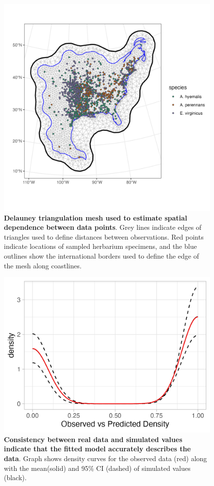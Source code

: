 \documentclass[11pt]{article}
\begin{document}
	\begin{figure}[H]
		\centering
		\includegraphics[width = \linewidth]{../Plots/mesh_plot.png}
		\caption{\textbf{Delauney triangulation mesh used to estimate spatial dependence between data points}. Grey lines indicate edges of triangles used to define distances between observations. Red points indicate locations of sampled herbarium specimens, and the blue outlines show the international borders used to define the edge of the mesh along coastlines.}
		\label{fig:meshplot}
	\end{figure}

\begin{figure}[H]
	\centering
	\includegraphics[width = .8\linewidth]{density_plot.png}
	\caption{\textbf{Consistency between real data and simulated values indicate that the fitted model accurately describes the data}. Graph shows density curves for the observed data (red) along with the mean(solid) and 95\% CI (dashed) of simulated values (black).}
\end{figure}
\end{document}
